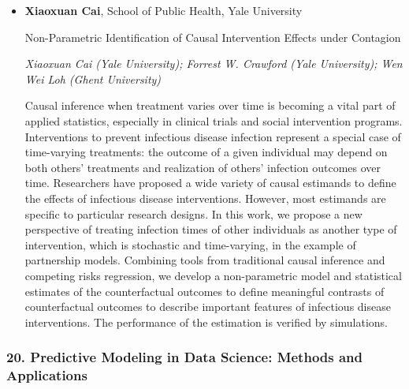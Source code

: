 \begin{itemize}
\item \textbf{Xiaoxuan Cai}, School of Public Health, Yale University

Non-Parametric Identification of Causal Intervention Effects under Contagion

\emph{\footnotesize Xiaoxuan Cai (Yale University); Forrest W. Crawford (Yale University); Wen Wei Loh (Ghent University)}

Causal inference when treatment varies over time is becoming a vital part of applied statistics, especially in clinical trials and social intervention programs. Interventions to prevent infectious disease infection represent a special case of time-varying treatments: the outcome of a given individual may depend on both others’ treatments and realization of others’ infection outcomes over time. Researchers have proposed a wide variety of causal estimands to define the effects of infectious disease interventions. However, most estimands are specific to particular research designs. In this work, we propose a new perspective of treating infection times of other individuals as another type of intervention, which is stochastic and time-varying, in the example of partnership models. Combining tools from traditional causal inference and competing risks regression, we develop a non-parametric model and statistical estimates of the counterfactual outcomes to define meaningful contrasts of counterfactual outcomes to describe important features of infectious disease interventions. The performance of the estimation is verified by simulations.

\end{itemize}

\subsubsection*{20. Predictive Modeling in Data Science: Methods and Applications}

